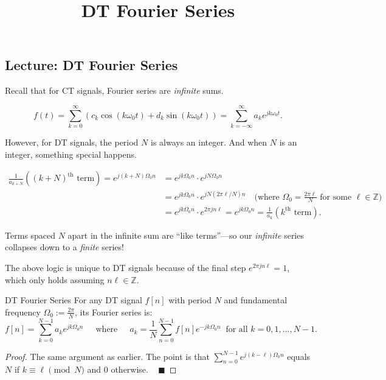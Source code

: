 \title{DT Fourier Series}



\subsection{Lecture: DT Fourier Series}

Recall that for CT signals, Fourier series are \emph{infinite} sums.

\[ f(t) = \sum_{k = 0}^{\infty} \left( c_k \cos(k \omega_0 t) + d_k \sin(k \omega_0 t) \right)
= \sum_{k = -\infty}^{\infty} a_k e^{j k \omega_0t}. \]

However, for DT signals, the period $N$ is always an integer.
And when $N$ is an integer, something special happens.

\begin{align*}
    \frac{1}{a_{k + N}}\left((k + N)^{\text{th}} \text{ term}\right) =
    e^{j (k + N) \Omega_0 n} & = e^{j k \Omega_0 n} \cdot e^{j N \Omega_0 n} \\
    & = e^{j k \Omega_0 n} \cdot e^{j N (2\pi \ell/ N) n} 
    ~~~ \text{ (where } \Omega_0 = \frac{2 \pi \ell}{N} \text{ for some } \ell \in \mathbb{Z}) \\
    & = e^{j k \Omega_0 n} \cdot e^{2 \pi j n\ell}  = e^{j k \Omega_0 n}
    = \frac{1}{a_k}\left(k^{\text{th}} \text{ term}\right).
\end{align*}

Terms spaced $N$ apart in the infinite sum are ``like terms''---so our \emph{infinite} series
collapses down to a \emph{finite} series!

\begin{remark}
    The above logic is unique to DT signals
    because of the final step $e^{2\pi j n \ell} = 1$, which only holds
    assuming $n \ell \in \mathbb{Z}$.
\end{remark}

\begin{theorem}{DT Fourier Series}
    For any DT signal $f[n]$ with period $N$
    and fundamental frequency $\Omega_0 := \frac{2\pi}{N}$, its Fourier series is:
    \[ f[n] = \sum_{k = 0}^{N - 1} a_k e^{j k \Omega_0 n} ~~~~~ \text{ where } ~~~~~
    a_k = \frac{1}{N} \sum_{n = 0}^{N - 1} f[n] e^{-j k \Omega_0 n} ~ \text{ for all }
    k = 0, 1, \dots, N - 1. \]  
\end{theorem}

\begin{proof}
    The same argument as earlier.  The point is that
    $\sum_{n = 0}^{N - 1} e^{j(k - \ell)\Omega_0n}$
    equals $N$ if $k \equiv \ell \pmod{N}$ and $0$ otherwise. ~ $\blacksquare$
\end{proof}

